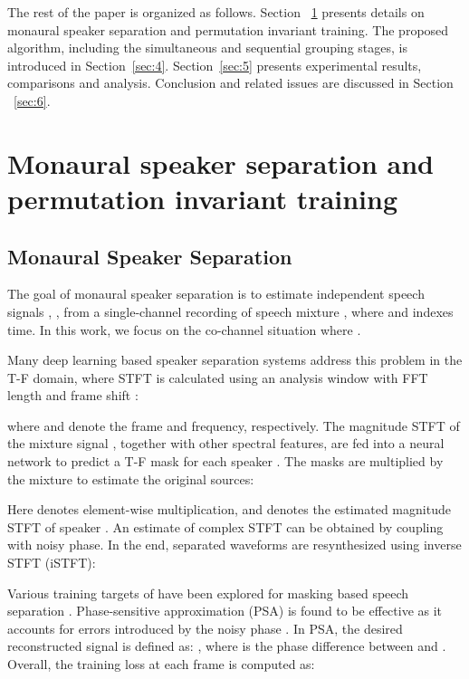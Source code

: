 \documentclass[journal]{IEEEtran}
\begin{document}
	
The rest of the paper is organized as follows. 
Section ~\ref{sec:3} presents details on monaural speaker separation and permutation invariant training. 
    The proposed algorithm, including the simultaneous and sequential grouping stages, is introduced in Section~\ref{sec:4}.
    Section~\ref{sec:5} presents experimental results, comparisons and analysis. 
    Conclusion and related issues are discussed in Section ~\ref{sec:6}.   


    









\section{Monaural speaker separation and permutation invariant training}
\label{sec:3}



\subsection{Monaural Speaker Separation}
\label{sec:3.1}

The goal of monaural speaker separation is to estimate  independent speech signals , , from a single-channel recording of speech mixture , where  and  indexes time. In this work, we focus on the co-channel situation where .

Many deep learning based speaker separation systems \cite{Du} \cite{Huang} \cite{Zhang} address this problem in the T-F domain, where STFT is calculated using an analysis window  with FFT length  and frame shift :


where  and  denote the frame and frequency, respectively. 
The magnitude STFT of the mixture signal , together with other spectral features, are fed into a neural network to predict a T-F mask  for each speaker .
The masks are multiplied by the mixture to estimate the original sources:

Here  denotes element-wise multiplication, and  denotes the estimated magnitude STFT of speaker .
An estimate of complex STFT  can be obtained by coupling  with noisy phase. 
In the end, separated waveforms are resynthesized using inverse STFT (iSTFT):


Various training targets of  have been explored for masking based speech separation \cite{Targets}.
Phase-sensitive approximation (PSA) is found to be effective as it accounts for errors introduced by the noisy phase \cite{PSM} \cite{PIT}.
In PSA, the desired reconstructed signal is defined as: , where  is the phase difference between  and .
Overall, the training loss at each frame is computed as:
\end{document}
